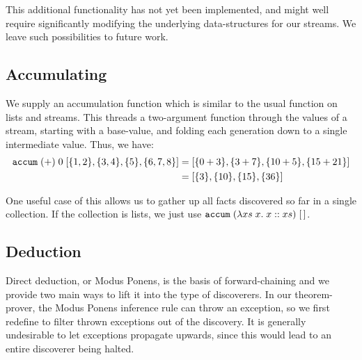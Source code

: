 This additional functionality has not yet been implemented, and might well require significantly modifying the underlying data-structures for our streams. We leave such possibilities to future work.

\subsection{Accumulating}
We supply an accumulation function which is similar to the usual  function on lists and streams. This threads a two-argument function through the values of a stream, starting with a base-value, and folding each generation down to a single intermediate value. Thus, we have:
\begin{align*}
\texttt{accum}\;(+)\;0\;[\{1,2\}, \{3,4\}, \{5\}, \{6,7,8\}] 
&= [\{0 + 3\}, \{3 + 7\}, \{10 + 5\}, \{15 + 21\}]\\
&= [\{3\}, \{10\}, \{15\}, \{36\}]
\end{align*}

One useful case of this allows us to gather up all facts discovered so far in a single collection. If the collection is lists, we just use $\texttt{accum}\;(\lambda xs\;x.\;x :: xs)\;[\,]$.


\subsection{Deduction}
Direct deduction, or Modus Ponens, is the basis of forward-chaining and we provide two main ways to lift it into the type of discoverers. In our theorem-prover, the Modus Ponens inference rule can throw an exception, so we first redefine  to filter thrown exceptions out of the discovery. It is generally undesirable to let exceptions propagate upwards, since this would lead to an entire discoverer being halted. 

